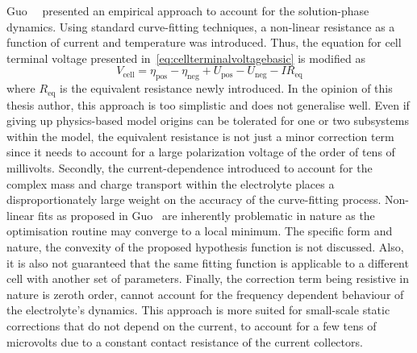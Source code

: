 Guo~\etal~\cite{Guo2011}  presented   an  empirical  approach  to   account  for
the  solution-phase   dynamics.  Using  standard  curve-fitting   techniques,  a
non-linear   resistance  as   a  function   of  current   and  temperature   was
introduced.   Thus,   the  equation   for   cell   terminal  voltage   presented
in~\cref{eq:cellterminalvoltagebasic} is modified as
\begin{equation}
    V_\text{cell} = η_\text{pos} - η_\text{neg} + U_\text{pos} - U_\text{neg} - I R_\text{eq}
\end{equation}
where  $R_\text{eq}$  is the  equivalent  resistance  newly introduced.  In  the
opinion of  this thesis  author, this  approach is too  simplistic and  does not
generalise well. Even if giving up  physics-based model origins can be tolerated
for one  or two subsystems  within the model,  the equivalent resistance  is not
just a minor correction term since it  needs to account for a large polarization
voltage of  the order  of tens of  millivolts. Secondly,  the current-dependence
introduced  to account  for the  complex mass  and charge  transport within  the
electrolyte  places a  disproportionately large  weight on  the accuracy  of the
curve-fitting process. Non-linear fits as proposed in Guo~\etal{} are inherently
problematic  in nature  as  the optimisation  routine may  converge  to a  local
minimum.  The specific  form and  nature, \eg{}  the convexity  of the  proposed
hypothesis function is  not discussed. Also, it is also  not guaranteed that the
same fitting  function is  applicable to  a different cell  with another  set of
parameters. Finally,  the correction  term being resistive  in nature  is zeroth
order,  \ie{}  cannot account  for  the  frequency  dependent behaviour  of  the
electrolyte's  dynamics. This  approach is  more suited  for small-scale  static
corrections that do not depend on the current,\eg{} to account for a few tens of
microvolts  due to  a constant  contact  resistance of  the current  collectors.


